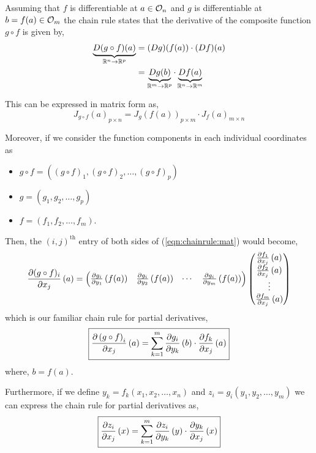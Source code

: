 \documentclass[../Analysis-3.tex]{subfiles}
\begin{document}
Assuming that $f$ is differentiable at $a \in \mathcal{O}_{n}$ and $g$ is differentiable at $b = f(a) \in \mathcal{O}_{m}$ the chain rule states that the derivative of the composite function $ g \circ f $ is given by,
\begin{align*}
  \underbrace{D(g \circ f)(a)}_{\mathbb{R}^n \to \mathbb{R}^p}
   & = (Dg)(f(a))\cdot (Df)(a)                                                     \\
   & = \underbrace{Dg(b)}_{\mathbb{R}^m \to \mathbb{R}^p} \cdot \underbrace{Df(a)}_{\mathbb{R}^n \to \mathbb{R}^m}
\end{align*}

This can be expressed in matrix form as,
\begin{equation} \label{eqn:chainrule:mat}
  {J_{g \circ f}(a)}_{p \times n} = {J_{g}(f(a))}_{p \times m}\cdot {J_{f}(a)}_{m \times n}
\end{equation}

Moreover, if we consider the function components in each individual coordinates as
\begin{itemize}
  \item $g \circ f = \left( (g \circ f)_1, (g \circ f)_2, \ldots, (g \circ f)_p \right)$
  \item $g = \left( g_1, g_2, \ldots, g_p \right)$
  \item $f = \left( f_1, f_2, \ldots, f_m \right)$.
\end{itemize}
Then, the $(i,j)^{\text{th}}$ entry of both sides of (\ref{eqn:chainrule:mat}) would become,
\[  \pdv{(g\circ f)_{i}}{x_j}\left( a \right) = \begin{pmatrix}
    \pdv{g_i}{y_1}\left( f(a) \right) & \pdv{g_i}{y_2}\left( f(a) \right) & \cdots & \pdv{g_i}{y_m}\left( f(a) \right)
  \end{pmatrix} \begin{pmatrix}
    \pdv{f_1}{x_j}\left( a \right) \\
    \pdv{f_2}{x_j}\left( a \right) \\
    \vdots                         \\
    \pdv{f_m}{x_j}\left( a \right)
  \end{pmatrix} \]
which is our familiar chain rule for partial derivatives,
\[  \boxed{
    \pdv{\left( g\circ f \right)_i}{x_j}\left( a \right) = \sum_{k = 1}^{m} \pdv{g_i}{y_k}\left( b \right)\cdot\pdv{f_k}{x_j}\left( a \right)
  } \]
where, $b = f(a)$.

\qquad

Furthermore, if we define $y_k = f_k \left( x_1, x_2, \ldots, x_n \right)$ and $z_i = g_i \left( y_1, y_2, \ldots, y_m \right)$ we can express the chain rule for partial derivatives as,
\[  \boxed{
    \pdv{z_i}{x_j}\left( x \right) = \sum_{k=1}^{m} \pdv{z_i}{y_k}\left( y \right) \cdot \pdv{y_k}{x_j}\left( x \right)
  } \]
\end{document}
